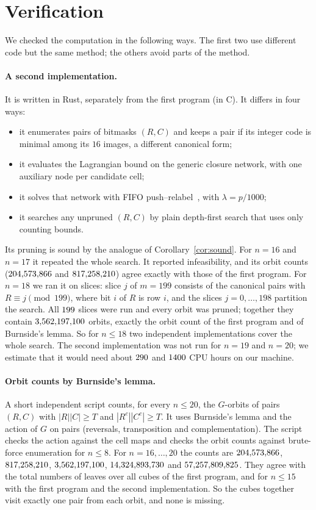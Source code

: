 \documentclass[11pt]{article}
\theoremstyle{remark}
\begin{document}
\section{Verification}\label{sec:ver}

We checked the computation in the following ways. The first two use different code but the same method;
the others avoid parts of the method.

\paragraph{A second implementation.} It is written in Rust, separately from the first program (in C).
It differs in four ways:
\begin{itemize}
\item it enumerates pairs of bitmasks $(R,C)$ and keeps a pair if its integer code is minimal among its
$16$ images, a different canonical form;
\item it evaluates the Lagrangian bound on the generic closure network, with one auxiliary node per
candidate cell;
\item it solves that network with FIFO push--relabel~\cite{GT}, with $\lambda=p/1000$;
\item it searches any unpruned $(R,C)$ by plain depth-first search that uses only counting bounds.
\end{itemize}
Its pruning is sound by the analogue of Corollary~\ref{cor:sound}. For $n=16$ and $n=17$ it repeated the
whole search. It reported infeasibility, and its orbit counts ($204{,}573{,}866$ and
$817{,}258{,}210$) agree exactly with those of the first program. For $n=18$ we ran it on slices:
slice $j$ of $m=199$ consists of the canonical pairs with $R\equiv j\pmod{199}$, where bit $i$ of $R$ is
row $i$, and the slices $j=0,\dots,198$ partition the search. All $199$ slices were run
and every orbit was pruned; together they contain $3{,}562{,}197{,}100$ orbits, exactly the orbit count of
the first program and of Burnside's lemma. So for $n\le18$ two independent implementations cover the whole
search. The second implementation was not run for $n=19$ and $n=20$; we estimate that it would need about
$290$ and $1400$ CPU hours on our machine.

\paragraph{Orbit counts by Burnside's lemma.} A short independent script counts, for every $n\le20$, the
$G$-orbits of pairs $(R,C)$ with $|R||C|\ge T$ and $|R^c||C^c|\ge T$. It uses Burnside's lemma and the
action of $G$ on pairs (reversals, transposition and complementation). The script checks the action
against the cell maps and checks the orbit counts against brute-force enumeration for $n\le8$. For
$n=16,\dots,20$ the counts are $204{,}573{,}866$, $817{,}258{,}210$, $3{,}562{,}197{,}100$,
$14{,}324{,}893{,}730$ and $57{,}257{,}809{,}825$. They agree with the total numbers of leaves over all cubes of the first program, and
for $n\le15$ with the first program and the second implementation. So the cubes together visit exactly one
pair from each orbit, and none is missing.
\end{document}
